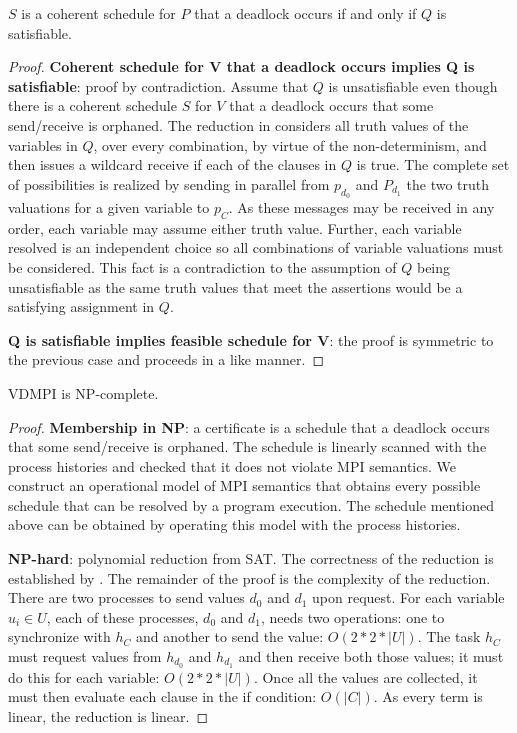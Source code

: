 \begin{lemma} \label{lem:sat}
$S$ is a coherent schedule for $P$ that a deadlock occurs if and only if $Q$ is satisfiable. 
\end{lemma}
\begin{proof}
\textbf{Coherent schedule for V that a deadlock occurs implies Q is satisfiable}: proof by
contradiction. Assume that $Q$ is unsatisfiable even though there is a
coherent schedule $S$ for $V$ that a deadlock occurs that some send/receive is orphaned. The
reduction in  considers all truth values of the
variables in $Q$, over every combination, by virtue of the
non-determinism, and then issues a wildcard receive if each of the clauses in
$Q$ is true. The complete set of possibilities is realized by sending in
parallel from $\mathit{p_{d_0}}$ and $\mathit{P_{d_1}}$ the two truth valuations for a
given variable to $\mathit{p_C}$. As these messages may be received in any
order, each variable may assume either truth value. Further, each
variable resolved is an independent choice so all combinations of
variable valuations must be considered.  This fact is a contradiction
to the assumption of $Q$ being unsatisfiable as the same truth values
that meet the assertions would be a satisfying assignment in $Q$.

\noindent \textbf{Q is satisfiable implies feasible schedule for V}:
the proof is symmetric to the previous case and proceeds in a like
manner.
\end{proof}

\begin{theorem}[NP-complete]
VDMPI is NP-complete.
\end{theorem}
\begin{proof}
\noindent\textbf{Membership in NP}: a certificate is a schedule
that a deadlock occurs that some send/receive is orphaned. The schedule is
linearly scanned with the process histories and checked that it does not
violate MPI semantics. We construct an operational model of MPI semantics that obtains every possible schedule that can be resolved by a program execution. The schedule mentioned above can be obtained by operating this model with the process histories. 

\noindent\textbf{NP-hard}: polynomial reduction from SAT. The
correctness of the reduction is established by .
The remainder of the proof is the complexity of the reduction. There
are two processes to send values $d_0$ and $d_1$ upon request. For each
variable $u_i \in U$, each of these processes, $d_0$ and $d_1$, needs two
operations: one to synchronize with $h_C$ and another to send the
value: $O(2 * 2 * |U|)$. The task $h_C$ must request values from
$h_{d_0}$ and $h_{d_1}$ and then receive both those values; it must do
this for each variable: $O(2 * 2 * |U|)$.  Once all the values
are collected, it must then evaluate each clause in the if condition: $O(|C|)$. As every
term is linear, the reduction is linear.
\end{proof}